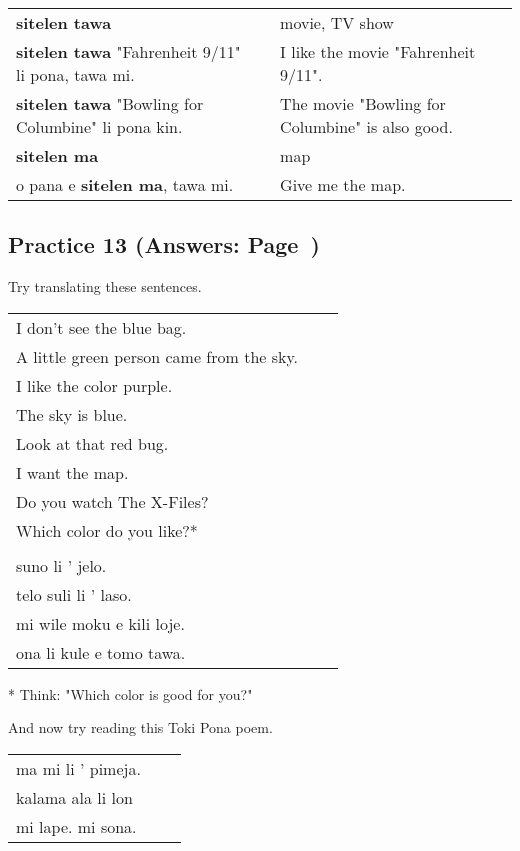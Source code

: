\begin{supertabular}{p{5,5cm}|ll}
\textbf{sitelen tawa}  && movie, TV show \\
\textbf{sitelen tawa} "Fahrenheit 9/11" li pona, tawa mi. && I like the movie "Fahrenheit 9/11". \\
\textbf{sitelen tawa} "Bowling for Columbine" li pona kin. && The movie "Bowling for Columbine" is also good. \\
\textbf{sitelen ma} && map \\
o pana e \textbf{sitelen ma}, tawa mi. && Give me the map. \\
\end{supertabular} 
%
\newpage
\subsection*{Practice 13 (Answers: Page~\pageref{'colors'})}
%
Try translating these sentences. \\

\begin{supertabular}{p{5,5cm}|ll}
I don't see the blue bag. &&   \\ %
A little green person came from the sky. &&   \\ %
I like the color purple.  &&  \\ %
The sky is blue. &&   \\ %
Look at that red bug.  &&  \\ %
I want the map.  &&  \\ %
Do you watch The X-Files? &&  \\  %
Which color do you like?* &&  \\  %
 && \\ %
suno li ' jelo. &&   \\ %
telo suli li ' laso.  &&  \\ %
mi wile moku e kili loje.  &&  \\ %
ona li kule e tomo tawa. &&   \\ %
\end{supertabular} 

* Think: "Which color is good for you?" 

And now try reading this Toki Pona poem. 

\begin{supertabular}{p{5,5cm}|ll}
ma mi li ' pimeja. && \\ %
kalama ala li lon && \\ %
mi lape. mi sona. && \\ %
\end{supertabular} 
